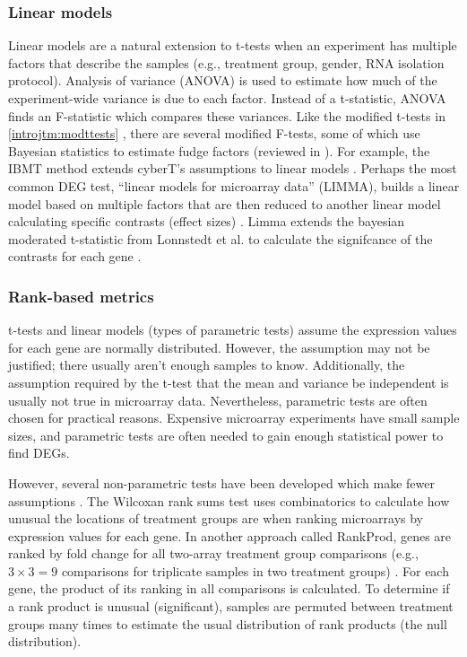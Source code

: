 \subsubsection{Linear models}
Linear models are a natural extension to t-tests when an experiment
has multiple factors that describe the samples (e.g., treatment group,
gender, RNA isolation protocol). Analysis of variance (ANOVA) is
used to estimate how much of the experiment-wide variance is 
due to each factor. Instead of a t-statistic, ANOVA finds an F-statistic
which compares these variances. Like the modified t-tests 
in \ref{introjtm:modttests} , there are
several modified F-tests, some of which use Bayesian statistics to
estimate fudge factors (reviewed in \cite{Cui:2003vl}).
For example, the IBMT method extends cyberT's assumptions to
linear models \cite{Sartor:2006hw}.
Perhaps the most common DEG test, ``linear models for
microarray data'' (LIMMA), builds a linear model based on multiple
factors that are then reduced to another linear model calculating
specific contrasts (effect sizes) \cite{Smyth:2005ht,Smyth:2004gh}. Limma extends the bayesian moderated
t-statistic from Lonnstedt et al. to calculate the signifcance 
of the contrasts for each gene \cite{Lonnstedt:2002wu}.


\subsubsection{Rank-based metrics}
t-tests and linear models (types of parametric tests) assume
the expression values for each gene are normally distributed. However, the
assumption may not be justified; there usually aren't enough samples to know.
Additionally, the assumption required by the t-test
that the mean and variance be independent is usually not true in microarray data.
Nevertheless, parametric tests are often chosen
for practical reasons. Expensive microarray experiments have small sample sizes, and
parametric tests are often needed to gain enough statistical power
to find DEGs.

However, several non-parametric tests have been developed which
make fewer assumptions \cite{Qi:2011tc}.
The Wilcoxan rank sums test uses combinatorics
to calculate how unusual the locations of treatment groups are when
ranking microarrays by expression values for each gene.
In another approach called RankProd, genes are ranked by fold change for all
two-array treatment group comparisons (e.g., $3\times3=9$ comparisons for triplicate 
samples in two treatment groups) \cite{Breitling:2004te,Breitling:2005ue,Hong:2006gf}.
For each gene, the product of its ranking in all comparisons is calculated.
To determine if
a rank product is unusual (significant), samples are permuted
between treatment groups many times to estimate the
usual distribution of rank products (the null distribution).


